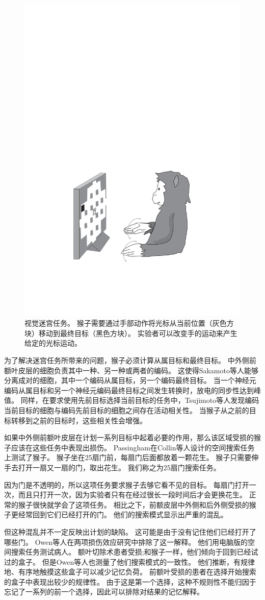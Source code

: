 \begin{figure}
	\centering
	\includegraphics[width=0.4\linewidth]{chap6/6_13}
	\caption{视觉迷宫任务。
		猴子需要通过手部动作将光标从当前位置（灰色方块）移动到最终目标（黑色方块）。
		实验者可以改变手的运动来产生给定的光标运动\cite{gaffan1996associative}。}
	\label{fig:6_13}
\end{figure}


为了解决迷宫任务所带来的问题，猴子必须计算从属目标和最终目标。
中外侧前额叶皮层的细胞负责其中一种、另一种或两者的编码\cite{saito2005representation}。
这使得Sakamoto等人\cite{sakamoto2008discharge}能够分离成对的细胞，其中一个编码从属目标，另一个编码最终目标。
当一个神经元编码从属目标和另一个神经元编码最终目标之间发生转换时，放电的同步性达到峰值。
同样，在要求使用先前目标选择当前目标的任务中，Tsujimoto等人\cite{tsujimoto2008transient}发现编码当前目标的细胞与编码先前目标的细胞之间存在活动相关性。
当猴子从之前的目标转移到之前的目标时，这些相关性会增强。


如果中外侧前额叶皮层在计划一系列目标中起着必要的作用，那么该区域受损的猴子应该在这些任务中表现出损伤。
Passingham\cite{passingham1985memory}在Collin等人\cite{collin1982role}设计的空间搜索任务上测试了猴子。
猴子坐在25扇门前，每扇门后面都放着一颗花生。
猴子只需要伸手去打开一扇又一扇的门，取出花生。
我们称之为25扇门搜索任务。


因为门是不透明的，所以这项任务要求猴子去够它看不见的目标。
每扇门打开一次，而且只打开一次，因为实验者只有在经过很长一段时间后才会更换花生。
正常的猴子很快就学会了这项任务。
相比之下，前额皮层中外侧和后外侧受损的猴子更经常回到它们已经打开的门。
他们的搜索模式显示出严重的混乱。


但这种混乱并不一定反映出计划的缺陷。
这可能是由于没有记住他们已经打开了哪些门。
Owen等人在两项损伤效应研究中排除了这一解释。
他们用电脑版的空间搜索任务测试病人。
额叶切除术患者受损;和猴子一样，他们倾向于回到已经试过的盒子。
但是Owen等人也测量了他们搜索模式的一致性。
他们推断，有规律地、有序地触摸这些盒子可以减少记忆负荷。
前额叶受损的患者在选择开始搜索的盒子中表现出较少的规律性。
由于这是第一个选择，这种不规则性不能归因于忘记了一系列的前一个选择，因此可以排除对结果的记忆解释。


